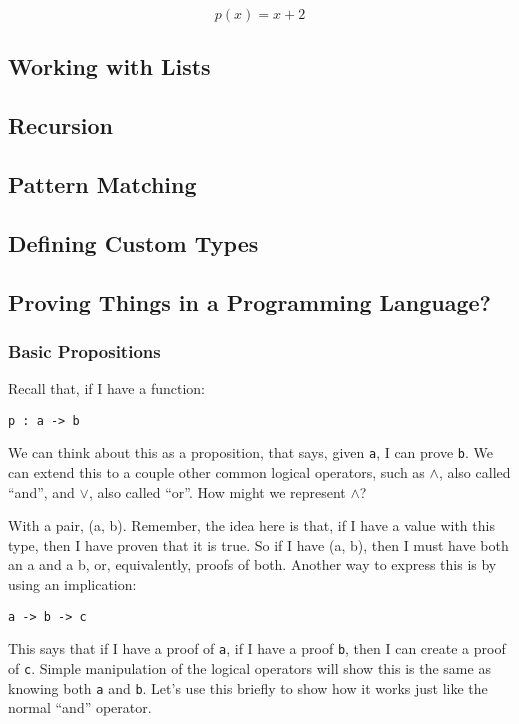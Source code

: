 \documentclass{article}
\newcommand{\inline}[1]{\texttt{#1}}
\begin{document}
\[
    p(x) = x + 2
\]

\subsection{Working with Lists}

\subsection{Recursion}

\subsection{Pattern Matching}

\subsection{Defining Custom Types}

\subsection{Proving Things in a Programming Language?}
\subsubsection{Basic Propositions}

Recall that, if I have a function:

\begin{verbatim}
p : a -> b
\end{verbatim}

We can think about this as a proposition, that says, given \inline{a}, I can prove \inline{b}.
We can extend this to a couple other common logical operators, such as $\wedge$, also called ``and'', and $\vee$, also called ``or''.
How might we represent $\wedge$?

With a pair, (a, b). Remember, the idea here is that, if I have a value with this type, then I have proven that it is true. So if I have (a, b), then I must have both an a and a b, or, equivalently, proofs of both. Another way to express this is by using an implication:

\begin{verbatim}
a -> b -> c
\end{verbatim}

This says that if I have a proof of \inline{a}, if I have a proof \inline{b}, then I can create a proof of \inline{c}.
Simple manipulation of the logical operators will show this is the same as knowing both \inline{a} and \inline{b}. %
Let’s use this briefly to show how it works just like the normal ``and'' operator.
\end{document}
